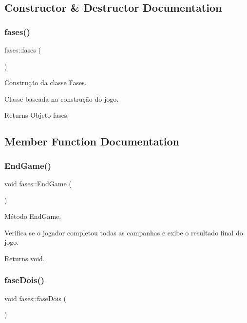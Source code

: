 \subsection{Constructor \& Destructor Documentation}
\mbox{\label{classfases_a39d5b42a40a958d25411c51cb2b0959c}} 
\subsubsection{\texorpdfstring{fases()}{fases()}}
{\footnotesize\ttfamily fases\+::fases (\begin{DoxyParamCaption}{ }\end{DoxyParamCaption})}



Construção da classe Fases. 

Classe baseada na construção do jogo. \begin{DoxyReturn}{Returns}
Objeto fases. 
\end{DoxyReturn}


\subsection{Member Function Documentation}
\mbox{\label{classfases_aa05ea0c25d2c70ee022f56f02003b4b5}} 
\subsubsection{\texorpdfstring{End\+Game()}{EndGame()}}
{\footnotesize\ttfamily void fases\+::\+End\+Game (\begin{DoxyParamCaption}{ }\end{DoxyParamCaption})}



Método End\+Game. 

Verifica se o jogador completou todas as campanhas e exibe o resultado final do jogo. \begin{DoxyReturn}{Returns}
void. 
\end{DoxyReturn}
\mbox{\label{classfases_a2f19632bd94eacd6c5437a2774bc529f}} 
\subsubsection{\texorpdfstring{fase\+Dois()}{faseDois()}}
{\footnotesize\ttfamily void fases\+::fase\+Dois (\begin{DoxyParamCaption}{ }\end{DoxyParamCaption})}



